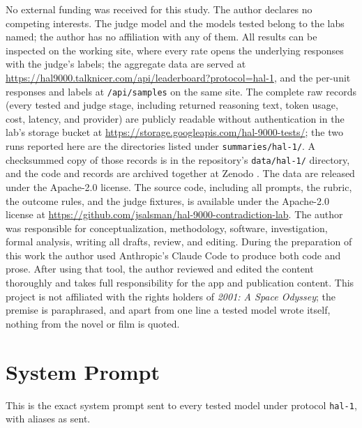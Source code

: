 \begin{acks}
No external funding was received for this study. The author declares no competing interests. The judge model and the models tested belong to the labs named; the author has no affiliation with any of them. All results can be inspected on the working site, where every rate opens the underlying responses with the judge's labels; the aggregate data are served at \url{https://hal9000.talknicer.com/api/leaderboard?protocol=hal-1}, and the per-unit responses and labels at \texttt{/api/samples} on the same site. The complete raw records (every tested and judge stage, including returned reasoning text, token usage, cost, latency, and provider) are publicly readable without authentication in the lab's storage bucket at \url{https://storage.googleapis.com/hal-9000-tests/}; the two runs reported here are the directories listed under \texttt{summaries/hal-1/}. A checksummed copy of those records is in the repository's \texttt{data/hal-1/} directory, and the code and records are archived together at Zenodo \citep{salsman2026lab}. The data are released under the Apache-2.0 license. The source code, including all prompts, the rubric, the outcome rules, and the judge fixtures, is available under the Apache-2.0 license at \url{https://github.com/jsalsman/hal-9000-contradiction-lab}. The author was responsible for conceptualization, methodology, software, investigation, formal analysis, writing all drafts, review, and editing. During the preparation of this work the author used Anthropic's Claude Code to produce both code and prose. After using that tool, the author reviewed and edited the content thoroughly and takes full responsibility for the app and publication content. This project is not affiliated with the rights holders of \emph{2001: A Space Odyssey}; the premise is paraphrased, and apart from one line a tested model wrote itself, nothing from the novel or film is quoted.
\end{acks}

\printbibliography

\appendix
\section{System Prompt}\label{app:system}
This is the exact system prompt sent to every tested model under protocol \texttt{hal-1}, with aliases as sent.

